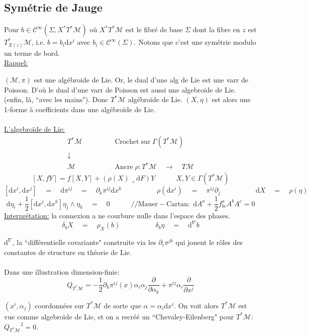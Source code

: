 \documentclass[a4paper,11pt]{article}
\renewcommand{\d}{{\mathrm{d}}}
\newcommand{\dr}[2]{\frac{\partial {#1}}{\partial{#2}}}
\begin{document}
\subsection{Symétrie de Jauge}
\quad Pour $b\in \mathcal C^\infty(\Sigma, X^*T^*\mathcal M)$ où $X^*T^*\mathcal M$ est le fibré de base $\Sigma$ dont la fibre en $z$ est $T^*_{X(z)}\mathcal{M}$, i.e. $b=b_i \d x^i$ avec $b_i \in\mathcal{C}^\infty(\Sigma)$. Notons que c'est une symétrie modulo un terme de bord.\\

\noindent\underline{Rappel:}

$(\mathcal{M},\pi)$ est une algébroide de Lie. Or, le dual d'une alg de Lie est une varr de Poisson. D'où le dual d'une varr de Poisson est aussi une algebroide de Lie. (enfin, là, ``avec les mains"). Donc $T^*\mathcal M$ algébroïde de Lie. $(X,\eta)$ est alors une 1-forme à coefficients dans une algébroïde de Lie.\\\\
\underline{L'algebroïde de Lie:}
$$\begin{matrix}
T^*\mathcal{M} &\quad \quad \quad & \mathrm{Crochet}\;\mathrm{sur}\; \Gamma(T^*\mathcal{M})\\
\downarrow\\
\mathcal{M} && \mathrm{Ancre}\;\rho: T^*\mathcal{M} \quad \longrightarrow \quad T\mathcal{M}
\end{matrix}$$
$$[X,fY] = f[X,Y] + (\rho(X)\lrcorner \d F)Y \quad\quad\quad X,Y\in\Gamma(T^*\mathcal{M})$$
$$[\d x^i, \d x^j] \quad=\quad \d \pi^{ij} \quad=\quad \partial_k \pi^{ij} \d x^k
\quad\quad\quad\quad\quad\rho(\d x^i) \quad=\quad \pi^{ij}\partial_j\quad\quad\quad\quad\quad
\d X \quad=\quad \rho(\eta)$$
$$\d\eta_i + \frac12[\d x^j, \d x^k] \eta_j\wedge\eta_k \quad = \quad 0 \quad\quad\quad /\!/\mathrm{Mauer}-\mathrm{Cartan}: \; \d A^a + \frac12 f^a_{bc}A^bA^c = 0$$
\underline{Interprétation:} la connexion a ne courbure nulle dans l'espace des phases.
$$\delta_b X \quad=\quad \rho_X (b) \quad\quad\quad\quad\quad \delta_b \eta \quad = \quad \d^\nabla b$$

$\d^\nabla$, la ``différentielle covariante"  construite via les $\partial_i \pi^{jk}$ qui jouent le rôles des constantes de structure en théorie de Lie.\\ \\
Dans une illustration dimension-finie:
$$Q_{T^*\mathcal{M}} = -\frac12 \partial_k \pi^{ij}(x) \alpha_i\alpha_j \dr{}{\alpha_k} + \pi^{ij} \alpha_i \dr{}{x^j}$$

$(x^i,\alpha_j)$ coordonnées sur $T^*\mathcal{M}$ de sorte que $\alpha = \alpha_i \d x^i$. On voit alors $T^*\mathcal{M}$ est vue comme algebroïde de Lie, et on a recréé un ``Chevaley-Eilenberg" pour $T^*\mathcal{M}$: ${Q_{T^*\mathcal{M}}}^2 = 0$.\\
\end{document}
